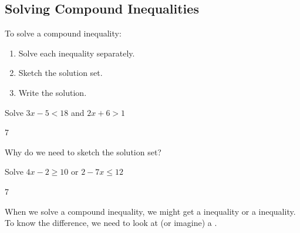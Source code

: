\subsection{Solving Compound Inequalities} 
To solve a compound inequality:
\begin{enumerate}
\item Solve each inequality separately.
\item Sketch the solution set.
\item Write the solution.
\end{enumerate}
\begin{Example}
Solve $3x-5<18$ and $2x+6>1$
\begin{cpic}{}{7}
\end{cpic}
\end{Example}
Why do we need to sketch the solution set?
\begin{Example}
Solve $4x-2\geq 10$ or $2-7x\leq 12$
\begin{cpic}{}{7}
\end{cpic}
\end{Example}
When we solve a compound inequality, we might get a \makeblank[1.5in] inequality or a \makeblank[1.5in] inequality. To know the difference, we need to look at (or imagine) a \makeblank[1in].